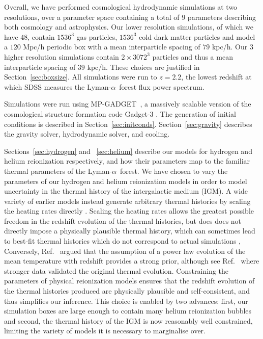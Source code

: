 \documentclass[a4paper,11pt]{article}
\newcommand{\Lya}{Lyman-$\alpha$}
\newcommand{\mpgadget}{{\small MP-GADGET}}
\begin{document}
Overall, we have performed cosmological hydrodynamic simulations at two resolutions, over a parameter space containing a total of $9$ parameters describing both cosmology and astrophysics. Our lower resolution simulations, of which we have $48$, contain $1536^3$ gas particles, $1536^3$ cold dark matter particles and model a $120$ Mpc/h periodic box with a mean interparticle spacing of $79$ kpc/h. Our $3$ higher resolution simulations contain $2\times 3072^3$ particles and thus a mean interparticle spacing of $39$ kpc/h. These choices are justified in Section~\ref{sec:boxsize}. All simulations were run to $z=2.2$, the lowest redshift at which SDSS measures the \Lya~forest flux power spectrum.

Simulations were run using \mpgadget~\cite{MPGadget2018, Bird:2022}, a massively scalable version of the cosmological structure formation code Gadget-3 \cite{Springel:2005}. The generation of initial conditions is described in Section~\ref{sec:initconds}. Section~\ref{sec:gravity} describes the gravity solver, hydrodynamic solver, and cooling.

Sections~\ref{sec:hydrogen} and ~\ref{sec:helium} describe our models for hydrogen and helium reionization respectively, and how their parameters map to the familiar thermal parameters of the \Lya~forest. We have chosen to vary the parameters of our hydrogen and helium reionization models in order to model uncertainty in the thermal history of the intergalactic medium (IGM).
A wide variety of earlier models instead generate arbitrary thermal histories by scaling the heating rates directly \cite[e.g.~][]{Viel:2006}. Scaling the heating rates allows the greatest possible freedom in the redshift evolution of the thermal histories, but does does not directly impose a physically plausible thermal history, which can sometimes lead to best-fit thermal histories which do not correspond to actual simulations \cite{Walther:2019}, Conversely, Ref.~\cite{Garzilli:2019} argued that the assumption of a power law evolution of the mean temperature with redshift \cite{Viel:2013wdm, Irsic:2017} provides a strong prior, although see Ref.~\cite{Garzilli:2021} where stronger data validated the original thermal evolution. Constraining the parameters of physical reionization models ensures that the redshift evolution of the thermal histories produced are physically plausible and self-consistent, and thus simplifies our inference. This choice is enabled by two advances: first, our simulation boxes are large enough to contain many helium reionization bubbles and second, the thermal history of the IGM is now reasonably well constrained, limiting the variety of models it is necessary to marginalise over.
\end{document}
